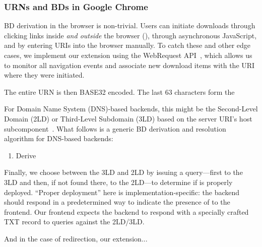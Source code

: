 \subsubsection{URNs and BDs in Google Chrome}

BD derivation in the browser is non-trivial. Users can initiate downloads
through clicking links inside \emph{and outside} the browser (), through asynchronous JavaScript, and by entering URIs into the
browser manually. To catch these and other edge cases, we implement our
extension using the WebRequest API~\cite{ExtensionAPI}, which allows us to
monitor all navigation events and associate new download items with the URI
where they were initiated.

The entire URN is then BASE32 encoded. The last 63 characters form the 

For Domain Name System (DNS)-based backends, this might be the Second-Level
Domain (2LD) or Third-Level Subdomain (3LD) based on the server URI's host
subcomponent~\cite{RFC3986}. What follows is a generic BD derivation and
resolution algorithm for DNS-based backends:

\begin{enumerate}
    \item Derive 
\end{enumerate}

Finally, we choose between the 3LD and 2LD by issuing a query---first to the 3LD
and then, if not found there, to the 2LD---to determine if \SYSTEM{} is properly
deployed. ``Proper deployment'' here is implementation-specific: the backend
should respond in a predetermined way to indicate the presence of \SYSTEM{} to
the frontend. Our frontend expects the backend to respond with a specially
crafted TXT record to queries against the 2LD/3LD.

And in the case of redirection, our extension...

